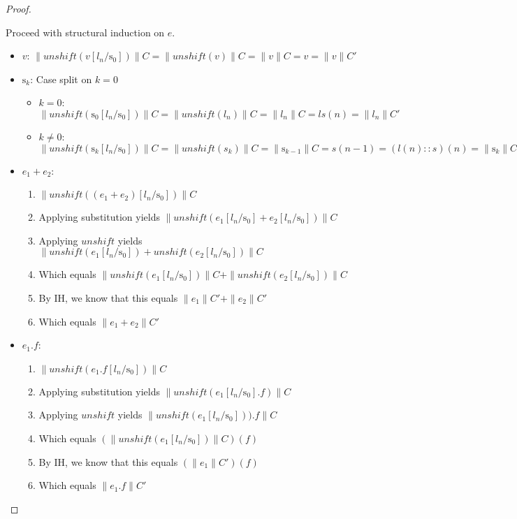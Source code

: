 \documentclass[a4paper,11pt]{article}
\newcommand{\UNSHIFT}{\mathit{unshift}}
\newcommand{\Stack}{\mathrm{s}}
\begin{document}
\begin{proof}
\begin{itemize}
\begin{itemize}
\begin{enumerate}
      Proceed with structural induction on $e$.
      \begin{itemize}
      \item $v$: $\| \UNSHIFT(v[l_n/\Stack_0]) \| C = \| \UNSHIFT(v) \| C = \| v \| C = v = \| v \| C'$
      \item $\Stack_k$: Case split on $k = 0$
        \begin{itemize}
        \item $k = 0$:    $\| \UNSHIFT(\Stack_0[l_n/\Stack_0]) \| C = \| \UNSHIFT(l_n) \| C = \| l_n \| C = ls(n) = \| l_n \| C'$
        \item $k \neq 0$: $\| \UNSHIFT(\Stack_k[l_n/\Stack_0]) \| C = \| \UNSHIFT(s_k) \| C = \| \Stack_{k-1} \| C = s(n-1) = (l(n)::s)(n) = \| \Stack_k \| C'$
        \end{itemize}
      \item $e_1 + e_2$:
        \begin{enumerate}
        \item $\| \UNSHIFT((e_1 + e_2)[l_n/\Stack_0]) \| C$
        \item Applying substitution yields $\| \UNSHIFT(e_1[l_n/\Stack_0] + e_2[l_n/\Stack_0]) \| C$
        \item Applying $\UNSHIFT$ yields $\| \UNSHIFT(e_1[l_n/\Stack_0]) + \UNSHIFT(e_2[l_n/\Stack_0]) \| C$
        \item Which equals $\| \UNSHIFT(e_1[l_n/\Stack_0]) \| C + \| \UNSHIFT(e_2[l_n/\Stack_0]) \| C$
        \item By IH, we know that this equals $\| e_1 \| C' + \| e_2 \| C'$
        \item Which equals $\| e_1 + e_2 \| C'$
        \end{enumerate}
      \item $e_1.f$:
        \begin{enumerate}
        \item $\| \UNSHIFT(e_1.f[l_n/\Stack_0]) \| C$
        \item Applying substitution yields $\| \UNSHIFT(e_1[l_n/\Stack_0].f) \| C$
        \item Applying $\UNSHIFT$ yields $\| \UNSHIFT(e_1[l_n/\Stack_0])).f \| C$
        \item Which equals $(\| \UNSHIFT(e_1[l_n/\Stack_0]) \| C)(f)$
        \item By IH, we know that this equals $(\| e_1 \| C')(f)$
        \item Which equals $\| e_1.f \| C'$
        \end{enumerate}


\end{itemize}
\end{enumerate}
\end{itemize}
\end{itemize}
\end{proof}
\end{document}
